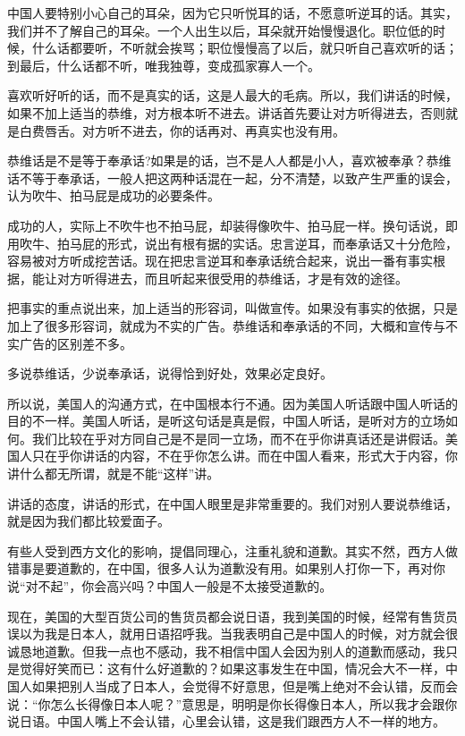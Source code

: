 \documentclass[fontset=fandol, a4paper, 12pt, openright]{ctexbook}
\begin{document}
中国人要特别小心自己的耳朵，因为它只听悦耳的话，不愿意听逆耳的话。其实，我们并不了解自己的耳朵。一个人出生以后，耳朵就开始慢慢退化。职位低的时候，什么话都要听，不听就会挨骂；职位慢慢高了以后，就只听自己喜欢听的话；到最后，什么话都不听，唯我独尊，变成孤家寡人一个。

喜欢听好听的话，而不是真实的话，这是人最大的毛病。所以，我们讲话的时候，如果不加上适当的恭维，对方根本听不进去。讲话首先要让对方听得进去，否则就是白费唇舌。对方听不进去，你的话再对、再真实也没有用。

恭维话是不是等于奉承话?如果是的话，岂不是人人都是小人，喜欢被奉承？恭维话不等于奉承话，一般人把这两种话混在一起，分不清楚，以致产生严重的误会，认为吹牛、拍马屁是成功的必要条件。

成功的人，实际上不吹牛也不拍马屁，却装得像吹牛、拍马屁一样。换句话说，即用吹牛、拍马屁的形式，说出有根有据的实话。忠言逆耳，而奉承话又十分危险，容易被对方听成挖苦话。现在把忠言逆耳和奉承话统合起来，说出一番有事实根据，能让对方听得进去，而且听起来很受用的恭维话，才是有效的途径。

把事实的重点说出来，加上适当的形容词，叫做宣传。如果没有事实的依据，只是加上了很多形容词，就成为不实的广告。恭维话和奉承话的不同，大概和宣传与不实广告的区别差不多。

多说恭维话，少说奉承话，说得恰到好处，效果必定良好。

所以说，美国人的沟通方式，在中国根本行不通。因为美国人听话跟中国人听话的目的不一样。美国人听话，是听这句话是真是假，中国人听话，是听对方的立场如何。我们比较在乎对方同自己是不是同一立场，而不在乎你讲真话还是讲假话。美国人只在乎你讲话的内容，不在乎你怎么讲。而在中国人看来，形式大于内容，你讲什么都无所谓，就是不能“这样”讲。

讲话的态度，讲话的形式，在中国人眼里是非常重要的。我们对别人要说恭维话，就是因为我们都比较爱面子。

有些人受到西方文化的影响，提倡同理心，注重礼貌和道歉。其实不然，西方人做错事是要道歉的，在中国，很多人认为道歉没有用。如果别人打你一下，再对你说“对不起”，你会高兴吗？中国人一般是不太接受道歉的。

现在，美国的大型百货公司的售货员都会说日语，我到美国的时候，经常有售货员误以为我是日本人，就用日语招呼我。当我表明自己是中国人的时候，对方就会很诚恳地道歉。但我一点也不感动，我不相信中国人会因为别人的道歉而感动，我只是觉得好笑而已：这有什么好道歉的？如果这事发生在中国，情况会大不一样，中国人如果把别人当成了日本人，会觉得不好意思，但是嘴上绝对不会认错，反而会说：“你怎么长得像日本人呢？”意思是，明明是你长得像日本人，所以我才会跟你说日语。中国人嘴上不会认错，心里会认错，这是我们跟西方人不一样的地方。
\end{document}

